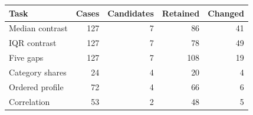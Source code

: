 \begin{tabular}{lrrrr}\toprule
Task & Cases & Candidates & Retained & Changed\\\midrule
Median contrast & 127 & 7 & 86 & 41\\
IQR contrast & 127 & 7 & 78 & 49\\
Five gaps & 127 & 7 & 108 & 19\\
Category shares & 24 & 4 & 20 & 4\\
Ordered profile & 72 & 4 & 66 & 6\\
Correlation & 53 & 2 & 48 & 5\\
\bottomrule\end{tabular}